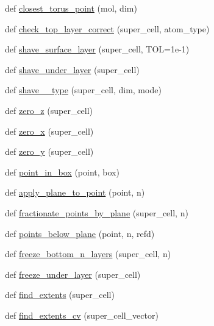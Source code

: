 \begin{DoxyCompactItemize}
def \hyperlink{namespacemolSimplify_1_1Scripts_1_1cellbuilder__tools_af8a1ed30f049db9b5e62efebf140ad97}{closest\+\_\+torus\+\_\+point} (mol, dim)
\item 
def \hyperlink{namespacemolSimplify_1_1Scripts_1_1cellbuilder__tools_a4e3c16c18b531561b257151f49a3f80f}{check\+\_\+top\+\_\+layer\+\_\+correct} (super\+\_\+cell, atom\+\_\+type)
\item 
def \hyperlink{namespacemolSimplify_1_1Scripts_1_1cellbuilder__tools_a66b86c0494d33f0dbb9f3a2d07d390d0}{shave\+\_\+surface\+\_\+layer} (super\+\_\+cell, T\+OL=1e-\/1)
\item 
def \hyperlink{namespacemolSimplify_1_1Scripts_1_1cellbuilder__tools_a0ac17a93be39924d06ddc4776f9409ce}{shave\+\_\+under\+\_\+layer} (super\+\_\+cell)
\item 
def \hyperlink{namespacemolSimplify_1_1Scripts_1_1cellbuilder__tools_a366d49b288a333d860eb9a8073a7b995}{shave\+\_\+\+\_\+type} (super\+\_\+cell, dim, mode)
\item 
def \hyperlink{namespacemolSimplify_1_1Scripts_1_1cellbuilder__tools_a2307500ffa15b4a8b125dae01b9daaad}{zero\+\_\+z} (super\+\_\+cell)
\item 
def \hyperlink{namespacemolSimplify_1_1Scripts_1_1cellbuilder__tools_abd5feaa3a0cf08a9a80a855251b56331}{zero\+\_\+x} (super\+\_\+cell)
\item 
def \hyperlink{namespacemolSimplify_1_1Scripts_1_1cellbuilder__tools_a79f70031760d72c50938aaa76a705e2f}{zero\+\_\+y} (super\+\_\+cell)
\item 
def \hyperlink{namespacemolSimplify_1_1Scripts_1_1cellbuilder__tools_a64709e9b5524ecf79b355c8a7d2061c3}{point\+\_\+in\+\_\+box} (point, box)
\item 
def \hyperlink{namespacemolSimplify_1_1Scripts_1_1cellbuilder__tools_a2b5818ce478be6724c93ae6ac06275e9}{apply\+\_\+plane\+\_\+to\+\_\+point} (point, n)
\item 
def \hyperlink{namespacemolSimplify_1_1Scripts_1_1cellbuilder__tools_aa402e5461f8810bd43ec6d195395926c}{fractionate\+\_\+points\+\_\+by\+\_\+plane} (super\+\_\+cell, n)
\item 
def \hyperlink{namespacemolSimplify_1_1Scripts_1_1cellbuilder__tools_a7dbb2984cc48a5aade3b7eccf417fed9}{points\+\_\+below\+\_\+plane} (point, n, refd)
\item 
def \hyperlink{namespacemolSimplify_1_1Scripts_1_1cellbuilder__tools_a5a8fb028f0813513c59a6dd20a4d079c}{freeze\+\_\+bottom\+\_\+n\+\_\+layers} (super\+\_\+cell, n)
\item 
def \hyperlink{namespacemolSimplify_1_1Scripts_1_1cellbuilder__tools_a751bf531779ab22dd1c1c1b10ab229fe}{freeze\+\_\+under\+\_\+layer} (super\+\_\+cell)
\item 
def \hyperlink{namespacemolSimplify_1_1Scripts_1_1cellbuilder__tools_aa0a1eea3e38c7c7adc6f2c908a314ff9}{find\+\_\+extents} (super\+\_\+cell)
\item 
def \hyperlink{namespacemolSimplify_1_1Scripts_1_1cellbuilder__tools_a52829c4cfef8850b9d12fd7e8ec8be29}{find\+\_\+extents\+\_\+cv} (super\+\_\+cell\+\_\+vector)
\end{DoxyCompactItemize}



